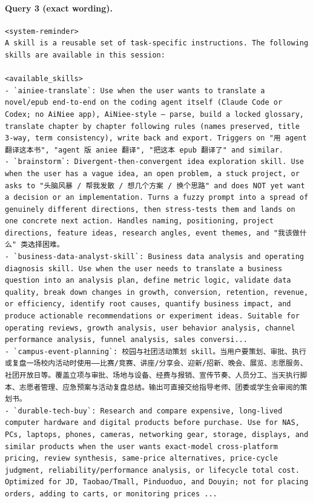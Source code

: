 \documentclass[UTF8,10pt]{ctexart}
\begin{document}
\paragraph{Query 3 (exact wording).}
\begin{Verbatim}[breaklines=true,breakanywhere=true,fontsize=\scriptsize,frame=single,framesep=2pt]
<system-reminder>
A skill is a reusable set of task-specific instructions. The following skills are available in this session:

<available_skills>
- `ainiee-translate`: Use when the user wants to translate a novel/epub end-to-end on the coding agent itself (Claude Code or Codex; no AiNiee app), AiNiee-style — parse, build a locked glossary, translate chapter by chapter following rules (names preserved, title 3-way, term consistency), write back and export. Triggers on "用 agent 翻译这本书", "agent 版 aniee 翻译", "把这本 epub 翻译了" and similar.
- `brainstorm`: Divergent-then-convergent idea exploration skill. Use when the user has a vague idea, an open problem, a stuck project, or asks to "头脑风暴 / 帮我发散 / 想几个方案 / 换个思路" and does NOT yet want a decision or an implementation. Turns a fuzzy prompt into a spread of genuinely different directions, then stress-tests them and lands on one concrete next action. Handles naming, positioning, project directions, feature ideas, research angles, event themes, and "我该做什么" 类选择困难。
- `business-data-analyst-skill`: Business data analysis and operating diagnosis skill. Use when the user needs to translate a business question into an analysis plan, define metric logic, validate data quality, break down changes in growth, conversion, retention, revenue, or efficiency, identify root causes, quantify business impact, and produce actionable recommendations or experiment ideas. Suitable for operating reviews, growth analysis, user behavior analysis, channel performance analysis, funnel analysis, sales conversi...
- `campus-event-planning`: 校园与社团活动策划 skill。当用户要策划、审批、执行或复盘一场校内活动时使用——比赛/竞赛、讲座/分享会、迎新/招新、晚会、展览、志愿服务、社团开放日等。覆盖立项与审批、场地与设备、经费与报销、宣传节奏、人员分工、当天执行脚本、志愿者管理、应急预案与活动复盘总结。输出可直接交给指导老师、团委或学生会审阅的策划书。
- `durable-tech-buy`: Research and compare expensive, long-lived computer hardware and digital products before purchase. Use for NAS, PCs, laptops, phones, cameras, networking gear, storage, displays, and similar products when the user wants exact-model cross-platform pricing, review synthesis, same-price alternatives, price-cycle judgment, reliability/performance analysis, or lifecycle total cost. Optimized for JD, Taobao/Tmall, Pinduoduo, and Douyin; not for placing orders, adding to carts, or monitoring prices ...

\end{Verbatim}
\end{document}
